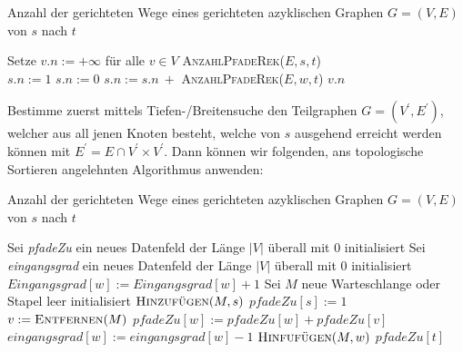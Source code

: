 
\begin{solution}

\phantom{}

\begin{algorithm}
    \caption{Anzahl der gerichteten Wege eines gerichteten azyklischen Graphen $G = (V, E)$ von $s$ nach $t$}
    \begin{algorithmic}[1]
        \State Setze $v.n := +\infty$ für alle $v \in V$
        \State \Return \textsc{AnzahlPfadeRek}($E,s,t$)
        \EndProcedure
    \\
                    \State $s.n := 1$
                \Else
                    \State $s.n := 0$
                        \State $s.n := s.n\ +$ \textsc{AnzahlPfadeRek}($E,w,t$)
                    \EndFor
                \EndIf
            \EndIf
            \State \Return $v.n$
        \EndProcedure
    \end{algorithmic}
\end{algorithm}

\end{solution}

\begin{solution}
Bestimme zuerst mittels Tiefen-/Breitensuche den Teilgraphen $G = (V^{\prime},E^{\prime})$,
welcher aus all jenen Knoten besteht, welche von $s$ ausgehend erreicht werden können
mit $E^{\prime} = E\cap V^{\prime}\times V^{\prime}$. Dann können wir folgenden,
ans topologische Sortieren angelehnten Algorithmus anwenden:
\phantom{}
	\begin{algorithm}
		\caption{Anzahl der gerichteten Wege eines gerichteten azyklischen Graphen $G = (V, E)$ von $s$ nach $t$}
		\begin{algorithmic}[1]
			\State Sei \textit{pfadeZu} ein neues Datenfeld der Länge $|V|$ überall mit $0$ initialisiert
			\State Sei \textit{eingangsgrad} ein neues Datenfeld der Länge $|V|$ überall mit $0$ initialisiert
				\State $\textit{Eingangsgrad}[w] := \textit{Eingangsgrad}[w] + 1$
			\EndFor
			\State Sei $M$ neue Warteschlange oder Stapel leer initialisiert
			\State $\textsc{Hinzufügen}(M,s)$
			\State $\textit{pfadeZu}[s] := 1$
				\State $v := \textsc{Entfernen}(M)$
					\State $\textit{pfadeZu}[w] := \textit{pfadeZu}[w] + \textit{pfadeZu}[v]$
					\State $\textit{eingangsgrad}[w] := \textit{eingangsgrad}[w] - 1$
						\State $\textsc{Hinfufügen}(M,w)$
					\EndIf
				\EndFor
			\EndWhile
			\State \Return $\textit{pfadeZu}[t]$
			\EndProcedure
		\end{algorithmic}
	\end{algorithm}
\end{solution}

\FloatBarrier
